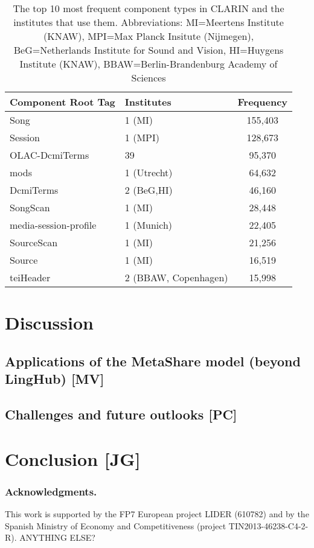 \documentclass{llncs}
\begin{document}
\begin{table}
    \begin{center}
    \begin{tabular}{l|lc}
        Component Root Tag & Institutes & Frequency \\
        \hline
        Song               & 1 (MI)     & 155,403   \\
        Session            & 1 (MPI)    & 128,673   \\
        OLAC-DcmiTerms     & 39         &  95,370   \\
        mods               & 1 (Utrecht)&  64,632   \\
        DcmiTerms          & 2 (BeG,HI) &  46,160   \\
        SongScan           & 1 (MI)     &  28,448   \\
        media-session-profile  & 1 (Munich) &  22,405   \\
        SourceScan         & 1 (MI)     &  21,256   \\
        Source             & 1 (MI)     &  16,519   \\
        teiHeader          & 2 (BBAW, Copenhagen) &  15,998   \\
    \end{tabular}
    \end{center}
    \caption{\label{tab:clarin-types}The top 10 most frequent component types in
    CLARIN and the institutes that use them. Abbreviations: MI=Meertens Institute (KNAW), 
    MPI=Max Planck Insitute (Nijmegen), BeG=Netherlands Institute for Sound and Vision,
HI=Huygens Institute (KNAW), BBAW=Berlin-Brandenburg Academy of Sciences}
\end{table}

\section{Discussion}
\label{sec:discussion}

\subsection{Applications of the MetaShare model (beyond LingHub) [MV]}
\label{sec:applications}

\subsection{Challenges and future outlooks [PC]}
\label{sec:challenges}

\section{Conclusion [JG]}
\label{sec:conclusion}

\subsubsection*{Acknowledgments.} This work is supported by the FP7 European project LIDER (610782) and by the Spanish Ministry of Economy and Competitiveness (project TIN2013-46238-C4-2-R). ANYTHING ELSE?




\end{document}
